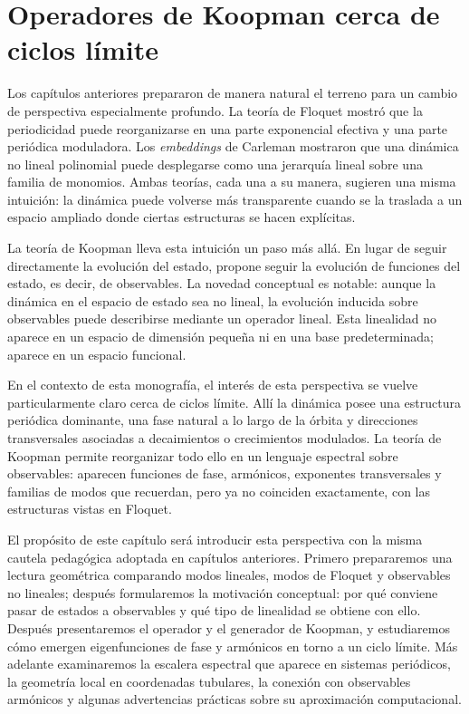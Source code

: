 \chapter{Operadores de Koopman cerca de ciclos límite}

Los capítulos anteriores prepararon de manera natural el terreno para un cambio de perspectiva especialmente profundo. La teoría de Floquet mostró que la periodicidad puede reorganizarse en una parte exponencial efectiva y una parte periódica moduladora. Los \emph{embeddings} de Carleman mostraron que una dinámica no lineal polinomial puede desplegarse como una jerarquía lineal sobre una familia de monomios. Ambas teorías, cada una a su manera, sugieren una misma intuición: la dinámica puede volverse más transparente cuando se la traslada a un espacio ampliado donde ciertas estructuras se hacen explícitas.

La teoría de Koopman lleva esta intuición un paso más allá. En lugar de seguir directamente la evolución del estado, propone seguir la evolución de funciones del estado, es decir, de observables. La novedad conceptual es notable: aunque la dinámica en el espacio de estado sea no lineal, la evolución inducida sobre observables puede describirse mediante un operador lineal. Esta linealidad no aparece en un espacio de dimensión pequeña ni en una base predeterminada; aparece en un espacio funcional.

En el contexto de esta monografía, el interés de esta perspectiva se vuelve particularmente claro cerca de ciclos límite. Allí la dinámica posee una estructura periódica dominante, una fase natural a lo largo de la órbita y direcciones transversales asociadas a decaimientos o crecimientos modulados. La teoría de Koopman permite reorganizar todo ello en un lenguaje espectral sobre observables: aparecen funciones de fase, armónicos, exponentes transversales y familias de modos que recuerdan, pero ya no coinciden exactamente, con las estructuras vistas en Floquet.

El propósito de este capítulo será introducir esta perspectiva con la misma cautela pedagógica adoptada en capítulos anteriores. Primero prepararemos una lectura geométrica comparando modos lineales, modos de Floquet y observables no lineales; después formularemos la motivación conceptual: por qué conviene pasar de estados a observables y qué tipo de linealidad se obtiene con ello. Después presentaremos el operador y el generador de Koopman, y estudiaremos cómo emergen eigenfunciones de fase y armónicos en torno a un ciclo límite. Más adelante examinaremos la escalera espectral que aparece en sistemas periódicos, la geometría local en coordenadas tubulares, la conexión con observables armónicos y algunas advertencias prácticas sobre su aproximación computacional.

